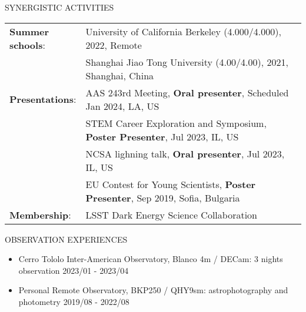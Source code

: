 \documentclass[10pt]{article} %
\begin{document}
\begin{section}{SYNERGISTIC ACTIVITIES}

\begin{tabular}{@{}p{0.2\linewidth}@{}p{0.8\linewidth}@{}}
    \textbf{Summer schools}: & University of California Berkeley (4.000/4.000), 2022, Remote \\
    & Shanghai Jiao Tong University (4.00/4.00), 2021, Shanghai, China \\
    \textbf{Presentations}: & AAS 243rd Meeting, \textbf{Oral presenter}, Scheduled Jan 2024, LA, US \\
    & STEM Career Exploration and Symposium, \textbf{Poster Presenter}, Jul 2023, IL, US \\
    & NCSA lighning talk, \textbf{Oral presenter}, Jul 2023, IL, US \\
    & EU Contest for Young Scientists, \textbf{Poster Presenter}, Sep 2019, Sofia, Bulgaria \\
    \textbf{Membership}: &LSST Dark Energy Science Collaboration \\
\end{tabular}

\end{section}

\begin{section}{OBSERVATION EXPERIENCES}
    
\begin{itemize}[leftmargin=1.5em]
    \item Cerro Tololo Inter-American Observatory, Blanco 4m / DECam: 3 nights observation \hfill 2023/01 - 2023/04
    \item Personal Remote Observatory, BKP250 / QHY9sm: astrophotography and photometry \hfill 2019/08 - 2022/08
\end{itemize}

\end{section}
\end{document}
